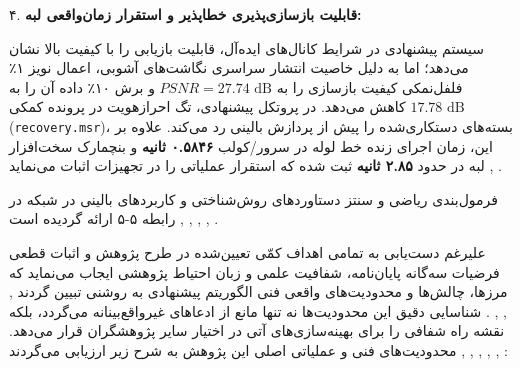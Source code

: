 

۴. \textbf{قابلیت بازسازی‌پذیری خطاپذیر  و استقرار زمان‌واقعی لبه:}\par

سیستم پیشنهادی در شرایط کانال‌های ایده‌آل، قابلیت بازیابی را با کیفیت بالا نشان می‌دهد؛ اما به دلیل خاصیت انتشار سراسری نگاشت‌های آشوبی، اعمال نویز ۱٪ فلفل‌نمکی کیفیت بازسازی را به $PSNR = 27.74\text{ dB}$ و برش ۱۰٪ داده آن را به $17.78\text{ dB}$ کاهش می‌دهد. در پروتکل پیشنهادی، تگ احرازهویت  در پرونده کمکی (\texttt{recovery.msr})، بسته‌های دستکاری‌شده را پیش از پردازش بالینی رد می‌کند. علاوه بر این، زمان اجرای زنده خط لوله در سرور/کولب \textbf{۰.۵۸۴۶ ثانیه} و بنچمارک سخت‌افزار لبه  در حدود \textbf{۲.۸۵ ثانیه} ثبت شده که استقرار عملیاتی را در تجهیزات  اثبات می‌نماید , .\par



فرمول‌بندی ریاضی و سنتز دستاوردهای روش‌شناختی و کاربردهای بالینی در شبکه  در رابطه ۵{-}۵ ارائه گردیده است , , , , .\par








علیرغم دست‌یابی به تمامی اهداف کمّی تعیین‌شده در طرح پژوهش و اثبات قطعی فرضیات سه‌گانه پایان‌نامه، شفافیت علمی و زبان احتیاط پژوهشی  ایجاب می‌نماید که مرزها، چالش‌ها و محدودیت‌های واقعی فنی الگوریتم پیشنهادی به روشنی تبیین گردند , , , . شناسایی دقیق این محدودیت‌ها نه تنها مانع از ادعاهای غیرواقع‌بینانه می‌گردد، بلکه نقشه راه شفافی را برای بهینه‌سازی‌های آتی در اختیار سایر پژوهشگران قرار می‌دهد. محدودیت‌های فنی و عملیاتی اصلی این پژوهش به شرح زیر ارزیابی می‌گردند , , , , , :\par

